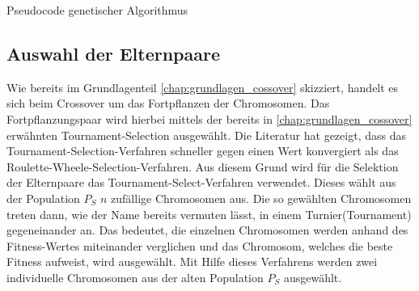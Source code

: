 \begin{algorithm}[H]
	\begin{algorithmic}[1]
%		
		
		 				
		 
	 	\ENDFOR
		\ENDFOR
		\ELSE
		\ENDIF
	\ENDWHILE
	\caption{Pseudocode genetischer Algorithmus}
	\label{code:pseudocode_genetic_algo}
\end{algorithmic}
\end{algorithm}

\subsection{Auswahl der Elternpaare}

Wie bereits im Grundlagenteil \ref{chap:grundlagen_cossover} skizziert, handelt es sich beim Crossover um das Fortpflanzen der Chromosomen.
Das Fortpflanzungspaar wird hierbei mittels der bereits in \ref{chap:grundlagen_cossover} erwähnten Tournament-Selection ausgewählt. Die Literatur \cite{zhong2005comparison} hat gezeigt, dass das Tournament-Selection-Verfahren schneller gegen einen Wert konvergiert als das Roulette-Wheele-Selection-Verfahren. Aus diesem Grund wird für die Selektion der Elternpaare das Tournament-Select-Verfahren verwendet. Dieses wählt aus der Population $P_S$ $n$ zufällige Chromosomen aus. Die so gewählten Chromosomen treten dann, wie der Name bereits vermuten lässt, in einem \glqq Turnier\grqq{ }(Tournament) gegeneinander an. Das bedeutet, die einzelnen Chromosomen werden anhand des Fitness-Wertes miteinander verglichen und das Chromosom, welches die beste Fitness aufweist, wird ausgewählt. Mit Hilfe dieses Verfahrens werden zwei individuelle Chromosomen aus der alten Population $P_S$ ausgewählt.
 
